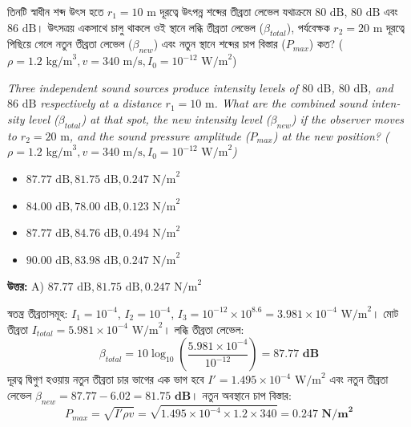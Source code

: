 \documentclass[12pt, a4paper]{article}
\begin{document}
\begin{tcolorbox}[questionbox={প্রশ্ন (Question) 20}]
    \noindent
    তিনটি স্বাধীন শব্দ উৎস হতে $r_1 = 10\text{ m}$ দূরত্বে উৎপন্ন শব্দের তীব্রতা লেভেল যথাক্রমে $80\text{ dB}$, $80\text{ dB}$ এবং $86\text{ dB}$। উৎসত্রয় একসাথে চালু থাকলে ওই স্থানে লব্ধি তীব্রতা লেভেল ($\beta_{total}$), পর্যবেক্ষক $r_2 = 20\text{ m}$ দূরত্বে পিছিয়ে গেলে নতুন তীব্রতা লেভেল ($\beta_{new}$) এবং নতুন স্থানে শব্দের চাপ বিস্তার ($P_{max}$) কত? ($\rho = 1.2\text{ kg/m}^3, v = 340\text{ m/s}, I_0 = 10^{-12}\text{ W/m}^2$)
    
    \vspace{0.8em}
    \begin{english}
    \noindent\textit{\color{darkgray}
    Three independent sound sources produce intensity levels of $80\text{ dB}$, $80\text{ dB}$, and $86\text{ dB}$ respectively at a distance $r_1 = 10\text{ m}$. What are the combined sound intensity level ($\beta_{total}$) at that spot, the new intensity level ($\beta_{new}$) if the observer moves to $r_2 = 20\text{ m}$, and the sound pressure amplitude ($P_{max}$) at the new position? ($\rho = 1.2\text{ kg/m}^3, v = 340\text{ m/s}, I_0 = 10^{-12}\text{ W/m}^2$)
    }
    \end{english}
\end{tcolorbox}

\begin{itemize}[label={}, leftmargin=1cm, itemsep=0.5em]
    \item[\textbf{A)}] $87.77\text{ dB}, 81.75\text{ dB}, 0.247\text{ N/m}^2$
    \item[\textbf{B)}] $84.00\text{ dB}, 78.00\text{ dB}, 0.123\text{ N/m}^2$
    \item[\textbf{C)}] $87.77\text{ dB}, 84.76\text{ dB}, 0.494\text{ N/m}^2$
    \item[\textbf{D)}] $90.00\text{ dB}, 83.98\text{ dB}, 0.247\text{ N/m}^2$
\end{itemize}

\vspace{0.5em}
\begin{tcolorbox}[answerbox]
    \textbf{\color{success} উত্তর:} A) $87.77\text{ dB}, 81.75\text{ dB}, 0.247\text{ N/m}^2$
\end{tcolorbox}
\vspace{1em}

\begin{tcolorbox}[solutionbox={সমাধান (Solution)}]
    \noindent
    স্বতন্ত্র তীব্রতাসমূহ: $I_1 = 10^{-4}$, $I_2 = 10^{-4}$, $I_3 = 10^{-12} \times 10^{8.6} = 3.981 \times 10^{-4}\text{ W/m}^2$। মোট তীব্রতা $I_{total} = 5.981 \times 10^{-4}\text{ W/m}^2$। লব্ধি তীব্রতা লেভেল:
    \[ \beta_{total} = 10 \log_{10}\left(\frac{5.981 \times 10^{-4}}{10^{-12}}\right) = \mathbf{87.77\text{ dB}} \]
    দূরত্ব দ্বিগুণ হওয়ায় নতুন তীব্রতা চার ভাগের এক ভাগ হবে $I' = 1.495 \times 10^{-4}\text{ W/m}^2$ এবং নতুন তীব্রতা লেভেল $\beta_{new} = 87.77 - 6.02 = \mathbf{81.75\text{ dB}}$। নতুন অবস্থানে চাপ বিস্তার:
    \[ P_{max} = \sqrt{I' \rho v} = \sqrt{1.495 \times 10^{-4} \times 1.2 \times 340} = \mathbf{0.247\text{ N/m}^2} \]
\end{tcolorbox}
\end{document}
